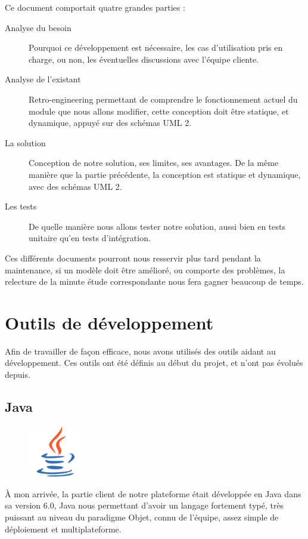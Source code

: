 Ce document comportait quatre grandes parties : 
\begin{description}
	\item[Analyse du besoin] Pourquoi ce développement est nécessaire, les cas d'utilisation pris en charge, ou non, les éventuelles discussions avec l'équipe cliente.
	\item[Analyse de l'existant] Retro-engineering permettant de comprendre le fonctionnement actuel du module que nous allons modifier, cette conception doit être statique, et dynamique, appuyé sur des schémas UML 2.
	\item[La solution] Conception de notre solution, ses limites, ses avantages. De la même manière que la partie précédente, la conception est statique et dynamique, avec des schémas UML 2.
	\item[Les tests] De quelle manière nous allons tester notre solution, aussi bien en tests unitaire qu'en tests d'intégration.
\end{description}

Ces différents documents pourront nous resservir plus tard pendant la maintenance, si un modèle doit être amélioré, ou comporte des problèmes, la relecture de la minute étude correspondante nous fera gagner beaucoup de temps.

\section{Outils de développement}
Afin de travailler de façon efficace, nous avons utilisés des outils aidant au développement. Ces outils ont été définis au début du projet, et n'ont pas évolués depuis.

\subsection{Java}
\begin{figure}
	\includegraphics[width=2.5cm]{contents/images/logoJava.png}
\end{figure}
À mon arrivée, la partie client de notre plateforme était développée en Java dans sa version 6.0, Java nous permettant d'avoir un langage fortement typé, très puissant au niveau du paradigme Objet, connu de l'équipe, assez simple de déploiement et multiplateforme. 


